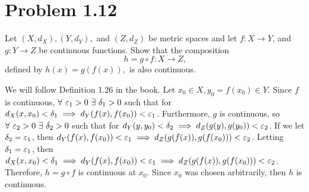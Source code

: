 \newpage
\section{Problem 1.12}
Let $(X, d_X), (Y, d_Y),$ and $(Z, d_Z)$ be metric spaces and let $f: X \rightarrow Y$, and $g: Y \rightarrow Z$ be continuous functions. Show that the composition
$$h = g\circ f: X\rightarrow Z,$$
defined by $h(x) = g(f(x)),$ is also continuous.
\partbreak
\begin{solution}

    We will follow Definition 1.26 in the book. Let $x_0 \in X, y_0 = f(x_0) \in Y$. Since $f$ is continuous, $\forall \ \ep_1 > 0 \ \exists \ \delta_1 > 0$ such that for $d_X(x, x_0) < \delta_1 \implies d_Y(f(x), f(x_0)) < \varepsilon_1$. Furthermore, $g$ is continuous, so $\forall \ \ep_2 > 0 \ \exists \ \delta_2 > 0$ such that for $d_Y(y, y_0) < \delta_2 \implies d_Z(g(y), g(y_0)) < \varepsilon_2$. If we let $\delta_2 = \varepsilon_1$, then $d_Y(f(x), f(x_0)) < \varepsilon_1 \implies d_Z(g(f(x)), g(f(x_0))) < \varepsilon_2$. Letting $\delta_1 = \varepsilon_1$, then $d_X(x, x_0) < \delta_1 \implies d_Y(f(x), f(x_0)) < \varepsilon_1 \implies d_Z(g(f(x)), g(f(x_0))) < \varepsilon_2$. Therefore, $h = g\circ f$ is continuous at $x_0$. Since $x_0$ was chosen arbitrarily, then $h$ is continuous. \hfill \square
\end{solution}

\newpage
